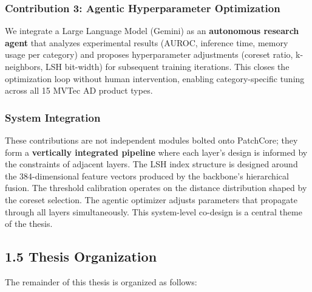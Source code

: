 \subsubsection{Contribution 3: Agentic Hyperparameter Optimization}\label{contribution-3-agentic-hyperparameter-optimization}

We integrate a Large Language Model (Gemini) as an \textbf{autonomous research agent} that analyzes experimental results (AUROC, inference time, memory usage per category) and proposes hyperparameter adjustments (coreset ratio, k-neighbors, LSH bit-width) for subsequent training iterations. This closes the optimization loop without human intervention, enabling category-specific tuning across all 15 MVTec AD product types.

\subsubsection{System Integration}\label{system-integration}

These contributions are not independent modules bolted onto PatchCore; they form a \textbf{vertically integrated pipeline} where each layer's design is informed by the constraints of adjacent layers. The LSH index structure is designed around the 384-dimensional feature vectors produced by the backbone's hierarchical fusion. The threshold calibration operates on the distance distribution shaped by the coreset selection. The agentic optimizer adjusts parameters that propagate through all layers simultaneously. This system-level co-design is a central theme of the thesis.

\subsection{1.5 Thesis Organization}\label{thesis-organization}

The remainder of this thesis is organized as follows:

